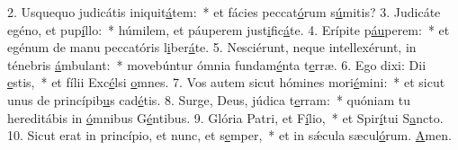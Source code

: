 2. Usquequo judicátis iniquit\uline{á}tem:~* et fácies peccat\uline{ó}rum s\uline{ú}mitis?
3. Judicáte egéno, et pup\uline{í}llo:~* húmilem, et páuperem just\uline{i}fic\uline{á}te.
4. Erípite p\uline{áu}perem:~* et egénum de manu peccatóris l\uline{i}ber\uline{á}te.
5. Nesciérunt, neque intellexérunt, in ténebris \uline{á}mbulant:~* movebúntur ómnia fundam\uline{é}nta t\uline{e}rræ.
6. Ego dixi: Dii \uline{e}stis,~* et fílii Exc\uline{é}lsi \uline{o}mnes.
7. Vos autem sicut hómines mori\uline{é}mini:~* et sicut unus de princípib\uline{u}s cad\uline{é}tis.
8. Surge, Deus, júdica t\uline{e}rram:~* quóniam tu hereditábis in \uline{ó}mnibus G\uline{é}ntibus.
9. Glória Patri, et F\uline{í}lio,~* et Spir\uline{í}tui S\uline{a}ncto.
10. Sicut erat in princípio, et nunc, et s\uline{e}mper,~* et in sǽcula sæcul\uline{ó}rum. \uline{A}men.
